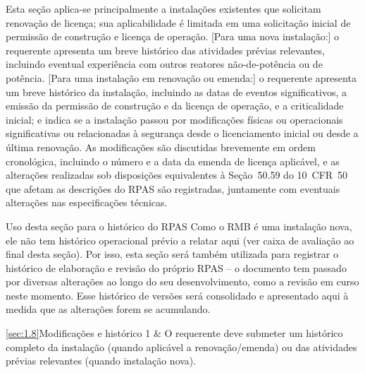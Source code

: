 Esta se\c{c}\~ao aplica-se principalmente a instala\c{c}\~oes existentes
que solicitam renova\c{c}\~ao de licen\c{c}a; sua aplicabilidade \'e
limitada em uma solicita\c{c}\~ao inicial de permiss\~ao de
constru\c{c}\~ao e licen\c{c}a de opera\c{c}\~ao. [Para uma nova instala\c{c}\~ao:] o requerente apresenta um breve
hist\'orico das atividades pr\'evias relevantes, incluindo eventual
experi\^encia com outros reatores n\~ao-de-pot\^encia ou de pot\^encia.
[Para uma instala\c{c}\~ao em renova\c{c}\~ao ou emenda:] o requerente
apresenta um breve hist\'orico da instala\c{c}\~ao, incluindo as datas de
eventos significativos, a emiss\~ao da permiss\~ao de constru\c{c}\~ao e
da licen\c{c}a de opera\c{c}\~ao, e a criticalidade inicial; e indica se
a instala\c{c}\~ao passou por modifica\c{c}\~oes f\'isicas ou
operacionais significativas ou relacionadas \`a seguran\c{c}a desde o
licenciamento inicial ou desde a \'ultima renova\c{c}\~ao. As
modifica\c{c}\~oes s\~ao discutidas brevemente em ordem cronol\'ogica,
incluindo o n\'umero e a data da emenda de licen\c{c}a aplic\'avel, e as
altera\c{c}\~oes realizadas sob disposi\c{c}\~oes equivalentes \`a
Se\c{c}\~ao~50.59 do 10~CFR~50 \citep{cfr10p50} que afetam as descri\c{c}\~oes
do RPAS s\~ao registradas, juntamente com eventuais altera\c{c}\~oes nas
especifica\c{c}\~oes t\'ecnicas.

\begin{observacao}{Uso desta se\c{c}\~ao para o hist\'orico do RPAS}
Como o RMB \'e uma instala\c{c}\~ao nova, ele n\~ao tem hist\'orico
operacional pr\'evio a relatar aqui (ver caixa de avalia\c{c}\~ao ao
final desta se\c{c}\~ao). Por isso, esta se\c{c}\~ao ser\'a tamb\'em
utilizada para registrar o hist\'orico de elabora\c{c}\~ao e revis\~ao
do pr\'oprio RPAS -- o documento tem passado por diversas altera\c{c}\~oes
ao longo do seu desenvolvimento, como a revis\~ao em curso neste
momento. Esse hist\'orico de vers\~oes ser\'a consolidado e apresentado
aqui \`a medida que as altera\c{c}\~oes forem se acumulando.
\end{observacao}

\begin{tabelaaceitacao}{\ref{sec:1.8}}{Modifica\c{c}\~oes e hist\'orico}
1 & O requerente deve submeter um hist\'orico completo da instala\c{c}\~ao
     (quando aplic\'avel a renova\c{c}\~ao/emenda) ou das atividades
     pr\'evias relevantes (quando instala\c{c}\~ao nova). \\
\end{tabelaaceitacao}

